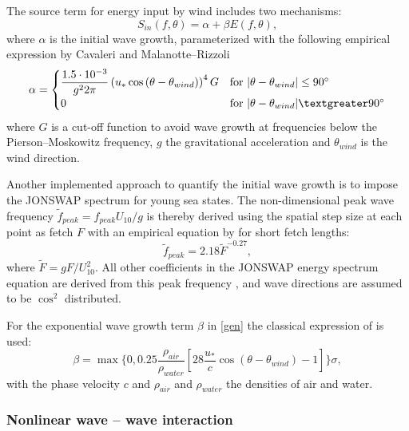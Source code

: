 The source term for energy input by wind includes two mechanisms:
\begin{equation}\label{gen}
 S_{in} (f, \theta) = \alpha + \beta E(f,\theta),
\end{equation}
where $\alpha$ is the initial wave growth, parameterized with the following empirical expression by Cavaleri and Malanotte--Rizzoli
\begin{equation}
 \alpha = 
 \begin{cases}
  \dfrac{1.5 \cdot 10^{-3}}{g^2 2 \pi} \left(u_\ast \cos{(\theta - \theta_{wind})}\right)^4 G & \text{for } |\theta - \theta_{wind}| \le 90^\circ  \\
  0 & \text{for } |\theta - \theta_{wind}| \textgreater 90^\circ  \\
 \end{cases}
\end{equation}
where $G$ is a cut-off function to avoid wave growth at frequencies below the Pierson--Moskowitz frequency, $g$ the gravitational acceleration and $\theta_{wind}$ is the wind direction. 

Another implemented approach to quantify the initial wave growth is to impose the JONSWAP spectrum for young sea states. The non-dimensional peak wave frequency $\tilde{f}_{peak} = f_{peak} U_{10} / g$ is thereby derived using the spatial step size at each point as fetch $F$ with an empirical equation by \cite{kahma1992} for short fetch lengths:
\begin{equation}
 \tilde{f}_{peak} = 2.18 \tilde{F}^{-0.27},
\end{equation}
where $\tilde{F} = g F / U_{10}^2$. All other coefficients in the JONSWAP energy spectrum equation are derived from this peak frequency \citep[][]{holthuijsen2007}, and  wave directions are assumed to be $\cos^2$ distributed.

For the exponential wave growth term $\beta$ in \eqref{gen} the classical expression of \citep[][]{komen1984} is used:
\begin{equation}
 \beta = \max \{ 0,0.25 \frac{\rho_{air}}{\rho_{water}} \left[28 \frac{u_\ast}{c} \cos(\theta - \theta_{wind}) -1 \right] \} \sigma,
\end{equation}
with the phase velocity $c$ and $\rho_{air}$ and $\rho_{water}$ the densities of air and water.

\subsubsection{Nonlinear wave -- wave interaction}

